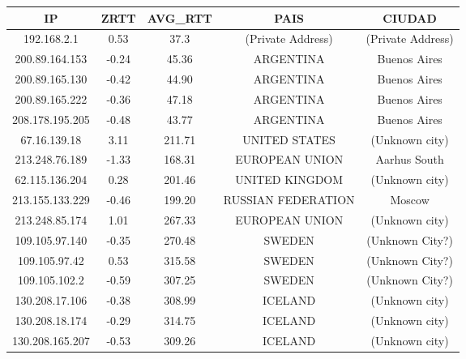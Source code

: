 \begin{tabular}{|c@{\hspace{5ex}}c@{\hspace{5ex}}c@{\hspace{5ex}}c@{\hspace{5ex}}c|}
 \hline
 \rule{0pt}{1.2em}IP & ZRTT & AVG\_RTT & PAIS & CIUDAD\\[0.2em]
 \hline

\rule{0pt}{1.2em} 192.168.2.1  &  0.53 & 37.3 & (Private Address) & (Private Address) \\[0.2em]
\rule{0pt}{1.2em} 200.89.164.153  &  -0.24 & 45.36 & ARGENTINA & Buenos Aires \\[0.2em]
\rule{0pt}{1.2em} 200.89.165.130  &  -0.42 & 44.90 & ARGENTINA & Buenos Aires \\[0.2em]
\rule{0pt}{1.2em} 200.89.165.222  &  -0.36 & 47.18 & ARGENTINA & Buenos Aires \\[0.2em]
\rule{0pt}{1.2em} 208.178.195.205  &  -0.48 & 43.77 & ARGENTINA & Buenos Aires \\[0.2em]
\rule{0pt}{1.2em} 67.16.139.18  &  3.11 & 211.71 & UNITED STATES & (Unknown city) \\[0.2em]
\rule{0pt}{1.2em} 213.248.76.189  &  -1.33 & 168.31 & EUROPEAN UNION & Aarhus South \\[0.2em]
\rule{0pt}{1.2em} 62.115.136.204  &  0.28 & 201.46 & UNITED KINGDOM & (Unknown city) \\[0.2em]
\rule{0pt}{1.2em} 213.155.133.229  &  -0.46 & 199.20 & RUSSIAN FEDERATION & Moscow \\[0.2em]
\rule{0pt}{1.2em} 213.248.85.174  &  1.01 & 267.33 & EUROPEAN UNION & (Unknown city) \\[0.2em]
\rule{0pt}{1.2em} 109.105.97.140  &  -0.35 & 270.48 & SWEDEN & (Unknown City?) \\[0.2em]
\rule{0pt}{1.2em} 109.105.97.42  &  0.53 & 315.58 & SWEDEN & (Unknown City?) \\[0.2em]
\rule{0pt}{1.2em} 109.105.102.2  &  -0.59 & 307.25 & SWEDEN & (Unknown City?) \\[0.2em]
\rule{0pt}{1.2em} 130.208.17.106  &  -0.38 & 308.99 & ICELAND & (Unknown city) \\[0.2em]
\rule{0pt}{1.2em} 130.208.18.174  &  -0.29 & 314.75 & ICELAND & (Unknown city) \\[0.2em]
\rule{0pt}{1.2em} 130.208.165.207  &  -0.53 & 309.26 & ICELAND & (Unknown city) \\[0.2em]
\hline
 \end{tabular}


